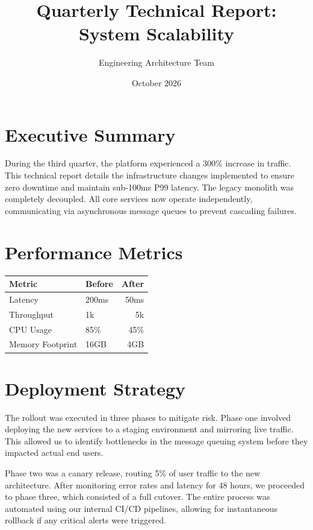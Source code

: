 \documentclass[10pt,a4paper]{article}
\begin{document}
\title{\vspace{-10mm}\textbf{Quarterly Technical Report: System Scalability}}
\author{Engineering Architecture Team}
\date{October 2026}
\maketitle

\section{Executive Summary}
During the third quarter, the platform experienced a 300\% increase in traffic. This technical report details the infrastructure changes implemented to ensure zero downtime and maintain sub-100ms P99 latency. The legacy monolith was completely decoupled. All core services now operate independently, communicating via asynchronous message queues to prevent cascading failures.

\section{Performance Metrics}
\begin{center}
\begin{tabular}{llr}
\toprule
Metric & Before & After \\
\midrule
Latency & 200ms & 50ms \\
Throughput & 1k & 5k \\
CPU Usage & 85\% & 45\% \\
Memory Footprint & 16GB & 4GB \\
\bottomrule
\end{tabular}
\end{center}

\section{Deployment Strategy}
The rollout was executed in three phases to mitigate risk. Phase one involved deploying the new services to a staging environment and mirroring live traffic. This allowed us to identify bottlenecks in the message queuing system before they impacted actual end users. 

Phase two was a canary release, routing 5\% of user traffic to the new architecture. After monitoring error rates and latency for 48 hours, we proceeded to phase three, which consisted of a full cutover. The entire process was automated using our internal CI/CD pipelines, allowing for instantaneous rollback if any critical alerts were triggered.
\end{document}
